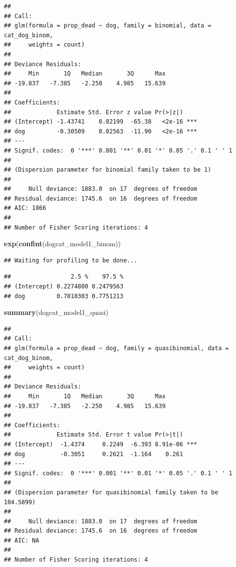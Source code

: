 \documentclass[]{article}
\newenvironment{Shaded}{\begin{snugshade}}{\end{snugshade}}
\newcommand{\KeywordTok}[1]{\textcolor[rgb]{0.13,0.29,0.53}{\textbf{#1}}}
\newcommand{\NormalTok}[1]{#1}
\begin{document}
\begin{verbatim}
## 
## Call:
## glm(formula = prop_dead ~ dog, family = binomial, data = cat_dog_binom, 
##     weights = count)
## 
## Deviance Residuals: 
##     Min       1Q   Median       3Q      Max  
## -19.837   -7.385   -2.250    4.985   15.639  
## 
## Coefficients:
##             Estimate Std. Error z value Pr(>|z|)    
## (Intercept) -1.43741    0.02199  -65.38   <2e-16 ***
## dog         -0.30509    0.02563  -11.90   <2e-16 ***
## ---
## Signif. codes:  0 '***' 0.001 '**' 0.01 '*' 0.05 '.' 0.1 ' ' 1
## 
## (Dispersion parameter for binomial family taken to be 1)
## 
##     Null deviance: 1883.0  on 17  degrees of freedom
## Residual deviance: 1745.6  on 16  degrees of freedom
## AIC: 1866
## 
## Number of Fisher Scoring iterations: 4
\end{verbatim}

\begin{Shaded}
\begin{Highlighting}[]
\KeywordTok{exp}\NormalTok{(}\KeywordTok{confint}\NormalTok{(dogcat_model1_binom))}
\end{Highlighting}
\end{Shaded}

\begin{verbatim}
## Waiting for profiling to be done...
\end{verbatim}

\begin{verbatim}
##                 2.5 %    97.5 %
## (Intercept) 0.2274800 0.2479563
## dog         0.7010303 0.7751213
\end{verbatim}

\begin{Shaded}
\begin{Highlighting}[]
\KeywordTok{summary}\NormalTok{(dogcat_model1_quasi)}
\end{Highlighting}
\end{Shaded}

\begin{verbatim}
## 
## Call:
## glm(formula = prop_dead ~ dog, family = quasibinomial, data = cat_dog_binom, 
##     weights = count)
## 
## Deviance Residuals: 
##     Min       1Q   Median       3Q      Max  
## -19.837   -7.385   -2.250    4.985   15.639  
## 
## Coefficients:
##             Estimate Std. Error t value Pr(>|t|)    
## (Intercept)  -1.4374     0.2249  -6.393 8.91e-06 ***
## dog          -0.3051     0.2621  -1.164    0.261    
## ---
## Signif. codes:  0 '***' 0.001 '**' 0.01 '*' 0.05 '.' 0.1 ' ' 1
## 
## (Dispersion parameter for quasibinomial family taken to be 104.5899)
## 
##     Null deviance: 1883.0  on 17  degrees of freedom
## Residual deviance: 1745.6  on 16  degrees of freedom
## AIC: NA
## 
## Number of Fisher Scoring iterations: 4
\end{verbatim}
\end{document}
